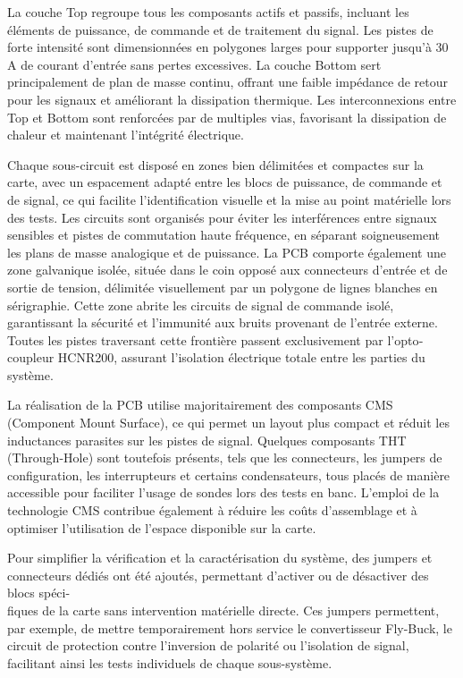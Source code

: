 La couche Top regroupe tous les composants actifs et passifs, incluant les éléments de puissance, de commande et de traitement du signal. Les pistes de forte intensité sont dimensionnées en polygones larges pour supporter jusqu'à 30 A de courant d'entrée sans pertes excessives. La couche Bottom sert principalement de plan de masse continu, offrant une faible impédance de retour pour les signaux et améliorant la dissipation thermique. Les interconnexions entre Top et Bottom sont renforcées par de multiples vias, favorisant la dissipation de chaleur et maintenant l'intégrité électrique.

Chaque sous-circuit est disposé en zones bien délimitées et compactes sur la carte, avec un espacement adapté entre les blocs de puissance, de commande et de signal, ce qui facilite l'identification visuelle et la mise au point matérielle lors des tests. Les circuits sont organisés pour éviter les interférences entre signaux sensibles et pistes de commutation haute fréquence, en séparant soigneusement les plans de masse analogique et de puissance. La PCB comporte également une zone galvanique isolée, située dans le coin opposé aux connecteurs d'entrée et de sortie de tension, délimitée visuellement par un polygone de lignes blanches en sérigraphie. Cette zone abrite les circuits de signal de commande isolé, garantissant la sécurité et l'immunité aux bruits provenant de l'entrée externe. Toutes les pistes traversant cette frontière passent exclusivement par l'opto­coupleur HCNR200, assurant l'isolation électrique totale entre les parties du système.

La réalisation de la PCB utilise majoritairement des composants CMS (Component Mount Surface), ce qui permet un layout plus compact et réduit les inductances parasites sur les pistes de signal. Quelques composants THT (Through-Hole) sont toutefois présents, tels que les connecteurs, les jumpers de configuration, les interrupteurs et certains condensateurs, tous placés de manière accessible pour faciliter l'usage de sondes lors des tests en banc. L'emploi de la technologie CMS contribue également à réduire les coûts d'assemblage et à optimiser l'utilisation de l'espace disponible sur la carte.

Pour simplifier la vérification et la caractérisation du système, des jumpers et connecteurs dédiés ont été ajoutés, permettant d'activer ou de désactiver des blocs spéci-\\ fiques de la carte sans intervention matérielle directe. Ces jumpers permettent, par exemple, de mettre temporairement hors service le convertisseur Fly-Buck, le circuit de protection contre l'inversion de polarité ou l'isolation de signal, facilitant ainsi les tests individuels de chaque sous-système.

